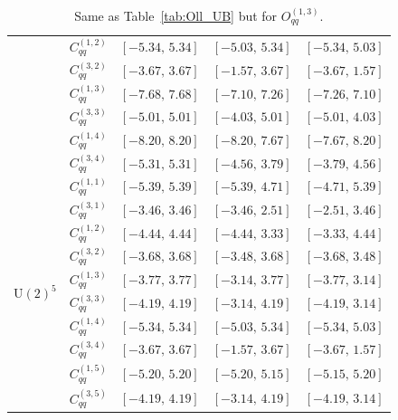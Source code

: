 \begin{table}[tbp]
{\begin{tabular}{ccccc}
        & $C_{qq}^{(1,2)}$ & $[-5.34,\, 5.34]$ & $[-5.03,\, 5.34]$ & $[-5.34,\, 5.03]$ \\
        & $C_{qq}^{(3,2)}$ & $[-3.67,\, 3.67]$ & $[-1.57,\, 3.67]$ & $[-3.67,\, 1.57]$ \\
        & $C_{qq}^{(1,3)}$ & $[-7.68,\, 7.68]$ & $[-7.10,\, 7.26]$ & $[-7.26,\, 7.10]$ \\
        & $C_{qq}^{(3,3)}$ & $[-5.01,\, 5.01]$ & $[-4.03,\, 5.01]$ & $[-5.01,\, 4.03]$ \\
        & $C_{qq}^{(1,4)}$ & $[-8.20,\, 8.20]$ & $[-8.20,\, 7.67]$ & $[-7.67,\, 8.20]$ \\
        & $C_{qq}^{(3,4)}$ & $[-5.31,\, 5.31]$ & $[-4.56,\, 3.79]$ & $[-3.79,\,4.56]$ \\
    \midrule
    \multirow{10}{*}{$\mathrm{U}(2)^5$}
        & $C_{qq}^{(1,1)}$ & $[-5.39,\, 5.39]$ & $[-5.39,\, 4.71]$ & $[-4.71,\, 5.39]$ \\
        & $C_{qq}^{(3,1)}$ & $[-3.46,\, 3.46]$ & $[-3.46,\, 2.51]$ & $[-2.51,\, 3.46]$ \\
        & $C_{qq}^{(1,2)}$ & $[-4.44,\, 4.44]$ & $[-4.44,\, 3.33]$ & $[-3.33,\, 4.44]$ \\
        & $C_{qq}^{(3,2)}$ & $[-3.68,\, 3.68]$ & $[-3.48,\, 3.68]$ & $[-3.68,\, 3.48]$ \\
        & $C_{qq}^{(1,3)}$ & $[-3.77,\, 3.77]$ & $[-3.14,\, 3.77]$ & $[-3.77,\, 3.14]$ \\
        & $C_{qq}^{(3,3)}$ & $[-4.19,\, 4.19]$ & $[-3.14,\, 4.19]$ & $[-4.19,\, 3.14]$ \\
        & $C_{qq}^{(1,4)}$ & $[-5.34,\, 5.34]$ & $[-5.03,\, 5.34]$ & $[-5.34,\, 5.03]$ \\
        & $C_{qq}^{(3,4)}$ & $[-3.67,\, 3.67]$ & $[-1.57,\, 3.67]$ & $[-3.67,\, 1.57]$ \\
        & $C_{qq}^{(1,5)}$ & $[-5.20,\, 5.20]$ & $[-5.20,\, 5.15]$ & $[-5.15,\, 5.20]$ \\
        & $C_{qq}^{(3,5)}$ & $[-4.19,\, 4.19]$ & $[-3.14,\, 4.19]$ & $[-4.19,\, 3.14]$ \\
    \bottomrule
\end{tabular}}
\caption{Same as Table~\ref{tab:Oll_UB} but for $O_{qq}^{(1,3)}$.}
\label{tab:Oqq_UB}
\end{table}
 
